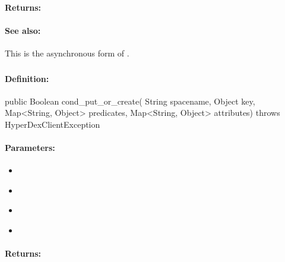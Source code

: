 \paragraph{Returns:}


\paragraph{See also:}  This is the asynchronous form of .

\pagebreak
\subsubsection{}
\label{api:java:cond_put_or_create}


\paragraph{Definition:}
\begin{javacode}
public Boolean cond_put_or_create(
        String spacename,
        Object key,
        Map<String, Object> predicates,
        Map<String, Object> attributes) throws HyperDexClientException
\end{javacode}

\paragraph{Parameters:}
\begin{itemize}[noitemsep]
\item {}\\

\item {}\\

\item {}\\

\item {}\\

\end{itemize}

\paragraph{Returns:}


